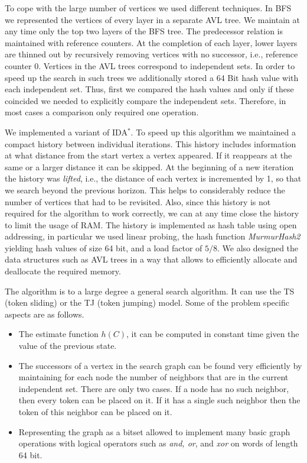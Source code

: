 \documentclass{article}
\begin{document}
To cope with the large number of vertices we used different techniques.
In BFS we represented the vertices of every layer in a separate AVL tree.
We maintain at any time only the top two layers of the BFS tree. The
predecessor relation is maintained with reference counters. At the
completion of each layer, lower layers are thinned out by recursively
removing vertices with no successor, i.e., reference counter 0. Vertices in
the AVL trees correspond to independent sets. In order to speed up the
search in such trees we additionally stored a 64 Bit hash value with
each independent set. Thus, first we compared the hash values and only
if these coincided we needed to explicitly compare the independent
sets. Therefore, in most cases a comparison only required one
operation.

We implemented a variant of IDA$^\ast$. To speed up this algorithm we
maintained a compact history between individual iterations. This
history includes information at what distance from the start vertex a
vertex appeared. If it reappears at the same or a larger distance it
can be skipped. At the beginning of a new iteration the history was
{\em lifted}, i.e., the distance of each vertex is incremented by 1,
so that we search beyond the previous horizon. This helps to
considerably reduce the number of vertices that had to be revisited.
Also, since this history is not required for the algorithm to work
correctly, we can at any time close the history to limit the usage of
RAM. The history is implemented as hash table using open addressing,
in particular we used linear probing, the hash function {\em
  MurmurHash2} yielding hash values of size 64 bit, and a load factor
of $5/8$. We also designed the data structures such as AVL trees in a
way that allows to efficiently allocate and deallocate the required
memory.

The algorithm is to a large degree a general search algorithm. It can
use the TS (token sliding) or the TJ (token jumping) model. Some of
the problem specific aspects are as follows.
\begin{itemize}
\item The estimate function $h(C)$, it can be computed in constant
  time given the value of the previous state.
\item The successors of a vertex in the search graph can be found very
  efficiently by maintaining for each node the number of neighbors
  that are in the current independent set. There are only two cases.
  If a node has no such neighbor, then every token can be placed on
  it. If it has a single such neighbor then the token of this neighbor
  can be placed on it.
\item Representing the graph as a bitset allowed to implement many
  basic graph operations with logical operators such as {\em and, or},
  and {\em xor} on words of length 64 bit.
\end{itemize}
\end{document}
